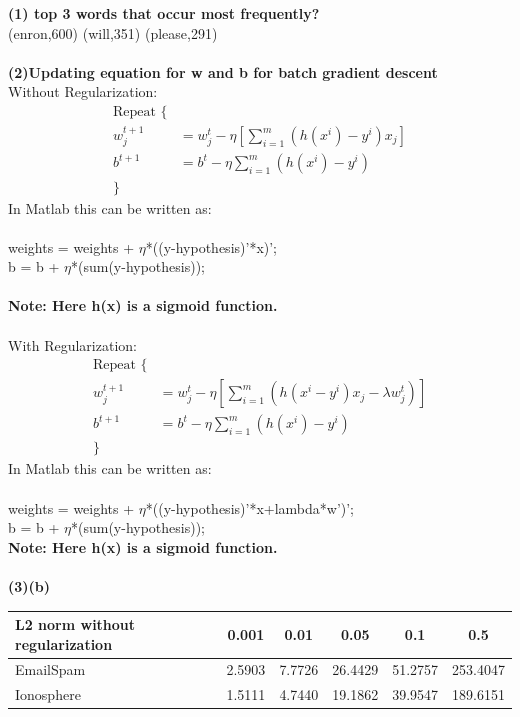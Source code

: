 \documentclass[paper=a4, fontsize=11pt]{scrartcl} %
\numberwithin{equation}{section} %
\numberwithin{figure}{section} %
\numberwithin{table}{section} %
\begin{document}
\textbf{(1) top 3 words that occur most frequently?}\\

{ (enron,600) (will,351) (please,291) }\\\\

\textbf{(2)Updating equation for w and b for batch gradient descent}\\

Without Regularization:
\begin{align*}
\text{Repeat \{}\\
w_{j}^{t+1} &= w_{j}^{t} - \eta[\sum_{i=1}^{m}(h(x^{i}) - y^{i})x_{j}]\\
b^{t+1} &= b^{t} - \eta \sum_{i=1}^{m}(h(x^{i}) - y^{i})\\
\text{\}}
\end{align*}
In Matlab this can be written as:\\\\
weights = weights + $\eta$*((y-hypothesis)'*x)';\\
b = b + $\eta$*(sum(y-hypothesis));\\\\
\textbf{Note: Here h(x) is a sigmoid function.}\\\\
With Regularization:
\begin{align*}
\text{Repeat \{}\\
w_{j}^{t+1} &= w_{j}^{t} - \eta[\sum_{i=1}^{m}(h(x^{i} - y^{i})x_{j} - \lambda w_{j}^{t})]\\
b^{t+1} &= b^{t} - \eta \sum_{i=1}^{m}(h(x^{i}) - y^{i})\\
\text{\}}
\end{align*}
In Matlab this can be written as:\\\\
weights = weights + $\eta$*((y-hypothesis)'*x+lambda*w')';\\
b = b + $\eta$*(sum(y-hypothesis));\\

\textbf{Note: Here h(x) is a sigmoid function.}\\\\

\textbf{(3)(b)}
\begin{tabular}{l*{5}{c}}
L2 norm without regularization	& 0.001 & 0.01 & 0.05 & 0.1 & 0.5\\
\hline
EmailSpam & 2.5903 & 7.7726 & 26.4429 & 51.2757 & 253.4047\\
Ionosphere & 1.5111 & 4.7440 & 19.1862 & 39.9547 & 189.6151\\
\end{tabular}\\\\
\end{document}
